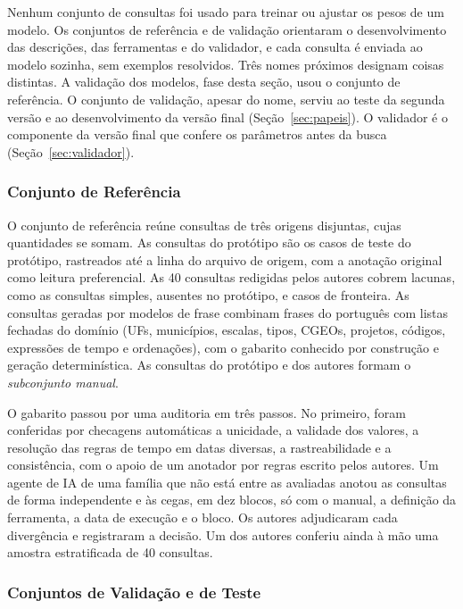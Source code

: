 Nenhum conjunto de consultas foi usado para treinar ou ajustar os pesos de um modelo. Os conjuntos de referência e de validação orientaram o desenvolvimento das descrições, das ferramentas e do validador, e cada consulta é enviada ao modelo sozinha, sem exemplos resolvidos. Três nomes próximos designam coisas distintas. A validação dos modelos, fase desta seção, usou o conjunto de referência. O conjunto de validação, apesar do nome, serviu ao teste da segunda versão e ao desenvolvimento da versão final (Seção~\ref{sec:papeis}). O validador é o componente da versão final que confere os parâmetros antes da busca (Seção~\ref{sec:validador}).

\subsubsection{Conjunto de Referência}
\label{sec:conjunto-referencia}

O conjunto de referência reúne  consultas de três origens disjuntas, cujas quantidades se somam. As consultas do protótipo são os  casos de teste do protótipo, rastreados até a linha do arquivo de origem, com a anotação original como leitura preferencial. As 40 consultas redigidas pelos autores cobrem lacunas, como as consultas simples, ausentes no protótipo, e casos de fronteira. As  consultas geradas por modelos de frase combinam frases do português com listas fechadas do domínio (UFs, municípios, escalas, tipos, CGEOs, projetos, códigos, expressões de tempo e ordenações), com o gabarito conhecido por construção e geração determinística. As  consultas do protótipo e dos autores formam o \emph{subconjunto manual}.

O gabarito passou por uma auditoria em três passos. No primeiro, foram conferidas por checagens automáticas a unicidade, a validade dos valores, a resolução das regras de tempo em datas diversas, a rastreabilidade e a consistência, com o apoio de um anotador por regras escrito pelos autores. Um agente de IA de uma família que não está entre as avaliadas anotou as consultas de forma independente e às cegas, em dez blocos, só com o manual, a definição da ferramenta, a data de execução e o bloco. Os autores adjudicaram cada divergência e registraram a decisão. Um dos autores conferiu ainda à mão uma amostra estratificada de 40 consultas.

\subsubsection{Conjuntos de Validação e de Teste}
\label{sec:conjuntos-validacao-teste}

